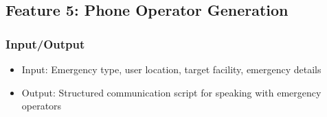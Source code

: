 

\subsection{Feature 5: Phone Operator Generation}

\subsubsection{Input/Output}
\begin{itemize}
    \item Input: Emergency type, user location, target facility, emergency details
    \item Output: Structured communication script for speaking with emergency operators
\end{itemize}

